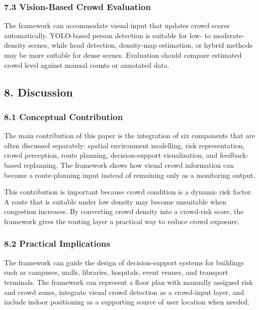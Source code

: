 \documentclass[
]{article}
\begin{document}
\subsubsection{7.3 Vision-Based Crowd
Evaluation}\label{vision-based-crowd-evaluation}

The framework can accommodate visual input that updates crowd scores
automatically. YOLO-based person detection is suitable for low- to
moderate-density scenes, while head detection, density-map estimation,
or hybrid methods may be more suitable for dense scenes. Evaluation
should compare estimated crowd level against manual counts or annotated
data.

\subsection{8. Discussion}\label{discussion}

\subsubsection{8.1 Conceptual
Contribution}\label{conceptual-contribution}

The main contribution of this paper is the integration of six components
that are often discussed separately: spatial environment modelling, risk
representation, crowd perception, route planning, decision-support
visualization, and feedback-based replanning. The framework shows how
visual crowd information can become a route-planning input instead of
remaining only as a monitoring output.

This contribution is important because crowd condition is a dynamic risk
factor. A route that is suitable under low density may become unsuitable
when congestion increases. By converting crowd density into a crowd-risk
score, the framework gives the routing layer a practical way to reduce
crowd exposure.

\subsubsection{8.2 Practical Implications}\label{practical-implications}

The framework can guide the design of decision-support systems for
buildings such as campuses, malls, libraries, hospitals, event venues,
and transport terminals. The framework can represent a floor plan with
manually assigned risk and crowd zones, integrate visual crowd detection
as a crowd-input layer, and include indoor positioning as a supporting
source of user location when needed.
\end{document}
